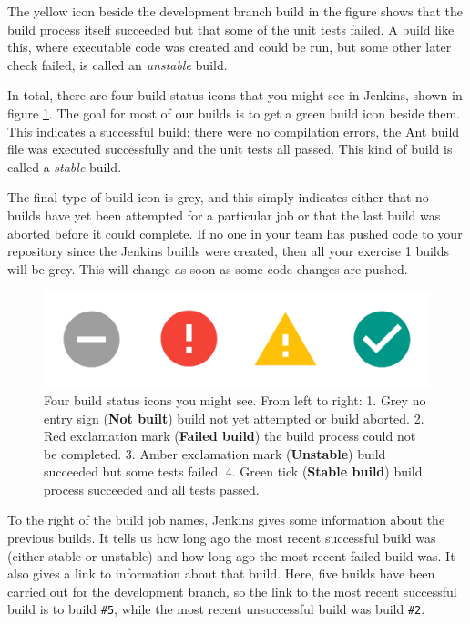 \documentclass[
]{book}
\begin{document}
The yellow icon beside the development branch build in the figure shows that the build process itself succeeded but that some of the unit tests failed. A build like this, where executable code was created and could be run, but some other later check failed, is called an \emph{unstable} build.

In total, there are four build status icons that you might see in Jenkins, shown in figure \ref{fig:build-status-montage-fig}. The goal for most of our builds is to get a green build icon beside them. This indicates a successful build: there were no compilation errors, the Ant build file was executed successfully and the unit tests all passed. This kind of build is called a \emph{stable} build.

The final type of build icon is grey, and this simply indicates either that no builds have yet been attempted for a particular job or that the last build was aborted before it could complete. If no one in your team has pushed code to your repository since the Jenkins builds were created, then all your exercise 1 builds will be grey. This will change as soon as some code changes are pushed.

\begin{figure}

{\centering \includegraphics[width=1\linewidth]{images/build-status-montage} 

}

\caption{Four build status icons you might see. From left to right: 1. Grey no entry sign (\textbf{Not built}) build not yet attempted or build aborted. 2. Red exclamation mark (\textbf{Failed build}) the build process could not be completed. 3. Amber exclamation mark (\textbf{Unstable}) build succeeded but some tests failed. 4. Green tick (\textbf{Stable build}) build process succeeded and all tests passed.}\label{fig:build-status-montage-fig}
\end{figure}



To the right of the build job names, Jenkins gives some information about the previous builds. It tells us how long ago the most recent successful build was (either stable or unstable) and how long ago the most recent failed build was. It also gives a link to information about that build. Here, five builds have been carried out for the development branch, so the link to the most recent successful build is to build \texttt{\#5}, while the most recent unsuccessful build was build \texttt{\#2}.
\end{document}
